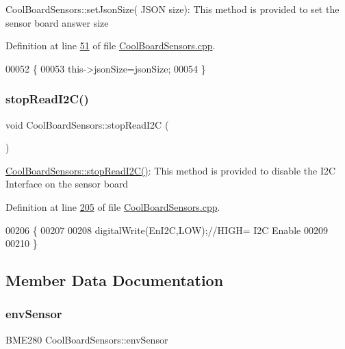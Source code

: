 Cool\+Board\+Sensors\+::set\+Json\+Size( J\+S\+O\+N size)\+: This method is provided to set the sensor board answer size 

Definition at line \hyperlink{_cool_board_sensors_8cpp_source_l00051}{51} of file \hyperlink{_cool_board_sensors_8cpp_source}{Cool\+Board\+Sensors.\+cpp}.


\begin{DoxyCode}
00052 \{
00053     this->jsonSize=jsonSize;
00054 \}
\end{DoxyCode}
\mbox{\label{class_cool_board_sensors_ab67b900b9e5e7c18d52d2d9107ba171b}} 
\subsubsection{\texorpdfstring{stop\+Read\+I2\+C()}{stopReadI2C()}}
{\footnotesize\ttfamily void Cool\+Board\+Sensors\+::stop\+Read\+I2C (\begin{DoxyParamCaption}{ }\end{DoxyParamCaption})}

\hyperlink{class_cool_board_sensors_ab67b900b9e5e7c18d52d2d9107ba171b}{Cool\+Board\+Sensors\+::stop\+Read\+I2\+C()}\+: This method is provided to disable the I2C Interface on the sensor board 

Definition at line \hyperlink{_cool_board_sensors_8cpp_source_l00205}{205} of file \hyperlink{_cool_board_sensors_8cpp_source}{Cool\+Board\+Sensors.\+cpp}.


\begin{DoxyCode}
00206 \{
00207 
00208     digitalWrite(EnI2C,LOW);\textcolor{comment}{//HIGH= I2C Enable}
00209 
00210 \}
\end{DoxyCode}


\subsection{Member Data Documentation}
\mbox{\label{class_cool_board_sensors_a868e38985e9a2412829fa2790ca13e2e}} 
\subsubsection{\texorpdfstring{env\+Sensor}{envSensor}}
{\footnotesize\ttfamily B\+M\+E280 Cool\+Board\+Sensors\+::env\+Sensor}



